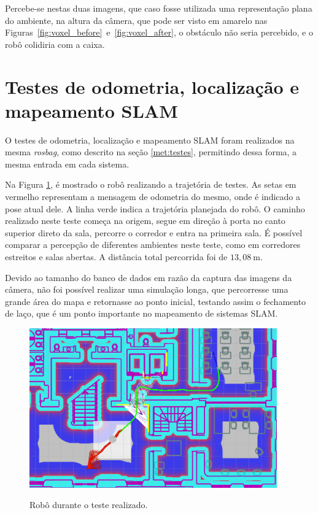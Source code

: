 \documentclass[repeatfields,xlists,xpacks,oneside,yearsonly]{ufrgscca}
\begin{document}
Percebe-se nestas duas imagens, que caso fosse utilizada uma
representação plana do ambiente, na altura da câmera, que pode ser
visto em amarelo nas
Figuras~\ref{fig:voxel_before}~e~\ref{fig:voxel_after}, o obstáculo
não seria percebido, e o robô colidiria com a caixa.

\section{Testes de odometria, localização e mapeamento SLAM}

O testes de odometria, localização e mapeamento SLAM foram realizados
na mesma \textit{rosbag}, como descrito na seção \ref{met:testes},
permitindo dessa forma, a mesma entrada em cada sistema.

Na Figura \ref{fig:base_bag}, é mostrado o robô realizando a
trajetória de testes. As setas em vermelho representam a mensagem de
odometria do mesmo, onde é indicado a pose atual dele. A linha verde
indica a trajetória planejada do robô. O caminho realizado neste
teste começa na origem, segue em direção à porta no canto superior
direto da sala, percorre o corredor e entra na primeira sala. É
possível comparar a percepção de diferentes ambientes neste teste,
como em corredores estreitos e salas abertas. A distância total
percorrida foi de $13,08~\si{\meter}$.

Devido ao tamanho do banco de dados em razão da captura das imagens
da câmera, não foi possível realizar uma simulação longa, que
percorresse uma grande área do mapa e retornasse ao ponto inicial,
testando assim o fechamento de laço, que é um ponto importante no
mapeamento de sistemas SLAM.

\begin{figure}[h]
    {
        \centering
        \caption{Robô durante o teste realizado.}
        \label{fig:base_bag}
        \includegraphics[width=0.95\textwidth]{base_bag_sim_zoom.png}\\
    }
\end{figure}
\end{document}
